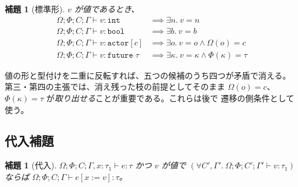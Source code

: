 \documentclass[11pt,a4paper]{ltjsarticle}
\newtheorem{lemma}[theorem]{補題}
\theoremstyle{definition}
\theoremstyle{remark}
\newcommand{\tint}{\mathtt{int}}
\newcommand{\tbool}{\mathtt{bool}}
\newcommand{\tact}[1]{\mathtt{actor}[#1]}
\newcommand{\tfut}[1]{\mathtt{future}\;#1}
\newcommand{\Om}{\Omega}          %
\newcommand{\Ph}{\Phi}            %
\newcommand{\jt}[3]{\Om;\Ph;#1;#2 \vdash #3}
\newcommand{\subs}[2]{[#1 := #2]}
\begin{document}
\begin{lemma}[標準形]
\label{lem:canon}
$v$ が値であるとき、
\[
\begin{array}{ll}
\jt{C}{\Gamma}{v : \tint} &\implies \exists n.\ v = n\\
\jt{C}{\Gamma}{v : \tbool} &\implies \exists b.\ v = b\\
\jt{C}{\Gamma}{v : \tact{c}} &\implies \exists o.\ v = o \land \Om(o) = c\\
\jt{C}{\Gamma}{v : \tfut{\tau}} &\implies
  \exists \kappa.\ v = \kappa \land \Ph(\kappa) = \tau
\end{array}
\]
\end{lemma}

値の形と型付けを二重に反転すれば、五つの候補のうち四つが矛盾で消える。
第三・第四の主張では、消え残った枝の前提としてそのまま $\Om(o) = c$、
$\Ph(\kappa) = \tau$ が\emph{取り出せる}ことが重要である。これらは後で
遷移の側条件として使う。

\subsection{代入補題}

\begin{lemma}[代入]
\label{lem:subst}
$\jt{C}{\Gamma, x{:}\tau_1}{e : \tau}$ かつ $v$ が値で
$(\forall C',\Gamma'.\ \Om;\Ph;C';\Gamma' \vdash v : \tau_1)$ ならば
$\jt{C}{\Gamma}{e\subs{x}{v} : \tau}$。
\end{lemma}
\end{document}
